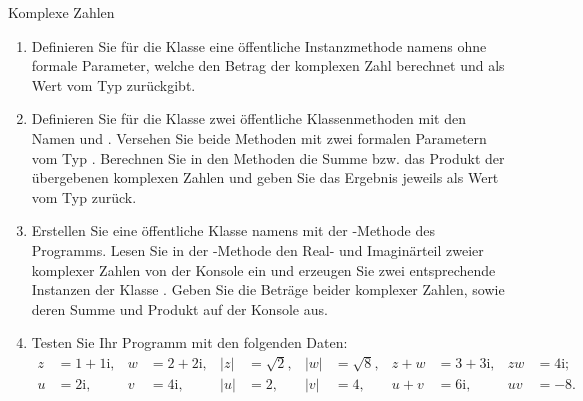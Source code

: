 \begin{exercise}{Komplexe Zahlen}
\begin{body}
\begin{enumerate}
\item Definieren Sie für die Klasse  eine öffentliche Instanzmethode namens  ohne formale Parameter, welche den Betrag der komplexen Zahl berechnet und als Wert vom Typ  zurückgibt.

\item Definieren Sie für die Klasse  zwei öffentliche Klassenmethoden mit den Namen  und .
Versehen Sie beide Methoden mit zwei formalen Parametern vom Typ .
Berechnen Sie in den Methoden die Summe bzw{.} das Produkt der übergebenen komplexen Zahlen und geben Sie das Ergebnis jeweils als Wert vom Typ  zurück.

\item Erstellen Sie eine öffentliche Klasse namens  mit der -Methode des Programms.
Lesen Sie in der -Methode den Real- und Imaginärteil zweier komplexer Zahlen von der Konsole ein und erzeugen Sie zwei entsprechende Instanzen der Klasse .
Geben Sie die Beträge beider komplexer Zahlen, sowie deren Summe und Produkt auf der Konsole aus.

\item Testen Sie Ihr Programm mit den folgenden Daten:
\begin{align*}
  z &= 1 + 1\mathrm{i}, 
& w &= 2 + 2\mathrm{i}, 
& \lvert z \rvert &= \sqrt{2}, 
& \lvert w \rvert &= \sqrt{8},
& z + w &= 3 + 3\mathrm{i},
& zw    &= 4\mathrm{i}; \\
  u &= 2\mathrm{i}, 
& v &= 4\mathrm{i}, 
& \lvert u \rvert &= 2, 
& \lvert v \rvert &= 4,
& u + v &= 6\mathrm{i},
& uv    &= -8.
\end{align*}
\end{enumerate}
\end{body}


\begin{solution}
\begin{small}
\end{small}
\end{solution}
\end{exercise}
